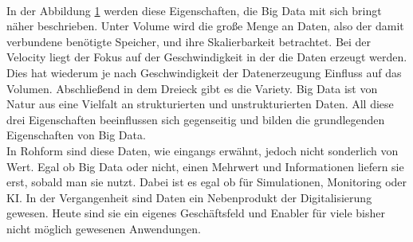 \begin{onehalfspace}
\begin{figure}[h]
            \label{fig:3VRule}
        \end{figure}
        \\
        In der Abbildung \ref*{fig:3VRule} werden diese Eigenschaften, die Big Data mit sich bringt näher beschrieben. Unter \glqq{}Volume\grqq{} wird die große Menge an Daten, also der damit verbundene benötigte Speicher, und ihre Skalierbarkeit betrachtet. Bei der \glqq{}Velocity\grqq{} liegt der Fokus auf der Geschwindigkeit in der die Daten erzeugt werden. Dies hat wiederum je nach Geschwindigkeit der Datenerzeugung Einfluss auf das Volumen. Abschließend in dem Dreieck gibt es die \glqq{}Variety\grqq{}. Big Data ist von Natur aus eine Vielfalt an strukturierten und unstrukturierten Daten. All diese drei Eigenschaften beeinflussen sich gegenseitig und bilden die grundlegenden Eigenschaften von Big Data.
        \\
        In Rohform sind diese Daten, wie eingangs erwähnt, jedoch nicht sonderlich von Wert. Egal ob Big Data oder nicht, einen Mehrwert und Informationen liefern sie erst, sobald man sie nutzt. Dabei ist es egal ob für Simulationen, Monitoring oder \ac{KI}. In der Vergangenheit sind Daten ein Nebenprodukt der Digitalisierung gewesen. Heute sind sie ein eigenes Geschäftsfeld und \glqq{}Enabler\grqq{} für viele bisher nicht möglich gewesenen Anwendungen.\cite{Otto2019}\cite{Gröger2021}


\end{onehalfspace}
